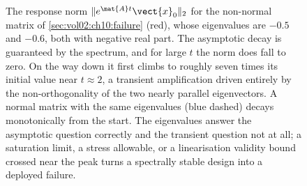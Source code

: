 \begin{figure}[htbp]
\centering
{}
\caption[Transient growth from a stable spectrum]{The response norm
$\lVert e^{\mat{A}t}\vect{x}_{0}\rVert_{2}$ for the non-normal matrix
of \cref{sec:vol02:ch10:failure} (red), whose eigenvalues are
$-0.5$ and $-0.6$, both with negative real part. The asymptotic decay
is guaranteed by the spectrum, and for large $t$ the norm does fall to
zero. On the way down it first climbs to roughly seven times its
initial value near $t \approx 2$, a transient amplification driven
entirely by the non-orthogonality of the two nearly parallel
eigenvectors. A normal matrix with the same eigenvalues (blue dashed)
decays monotonically from the start. The eigenvalues answer the
asymptotic question correctly and the transient question not at all;
a saturation limit, a stress allowable, or a linearisation validity
bound crossed near the peak turns a spectrally stable design into a
deployed failure.}
\label{fig:vol02:ch10:transient-growth}
\end{figure}
